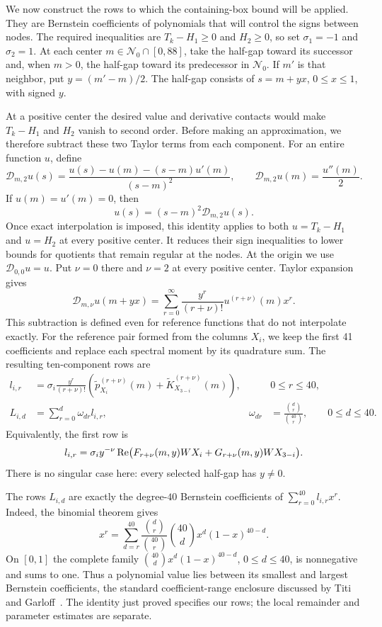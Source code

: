 We now construct the rows to which the containing-box bound will be applied.
They are Bernstein coefficients of polynomials that will control the signs
between nodes.  The required inequalities are $T_k-H_1\ge0$ and
$H_2\ge0$, so set $\sigma_1=-1$ and $\sigma_2=1$.
At each center
$m\in\mathcal N_0\cap[0,88]$, take the half-gap toward its successor and,
when $m>0$, the half-gap toward its predecessor in $\mathcal N_0$.  If $m'$
is that neighbor, put $y=(m'-m)/2$.  The half-gap consists of
$s=m+yx$, $0\le x\le1$, with signed $y$.

At a positive center the desired value and derivative contacts would make
$T_k-H_1$ and $H_2$ vanish to second order.  Before making an approximation,
we therefore subtract these two Taylor terms from each component.  For an
entire function $u$, define
\[
 \mathcal D_{m,2}u(s)
 =\frac{u(s)-u(m)-(s-m)u'(m)}{(s-m)^2},
 \qquad \mathcal D_{m,2}u(m)=\frac{u''(m)}2.
\]
If $u(m)=u'(m)=0$, then
\[
 u(s)=(s-m)^2\mathcal D_{m,2}u(s).
\]
Once exact interpolation is imposed, this identity applies to both
$u=T_k-H_1$ and $u=H_2$ at every positive center.  It reduces their sign
inequalities to lower bounds for quotients that remain regular at the nodes.
At the origin we use $\mathcal D_{0,0}u=u$.  Put $\nu=0$ there and $\nu=2$
at every positive center.  Taylor expansion gives
\[
 \mathcal D_{m,\nu}u(m+yx)
 =\sum_{r=0}^\infty\frac{y^r}{(r+\nu)!}u^{(r+\nu)}(m)x^r.
\]
This subtraction is defined even for reference functions that do not
interpolate exactly.  For the reference pair formed from the columns $X_i$,
we keep the first 41 coefficients and replace each spectral moment by its
quadrature sum.  The resulting ten-component rows are
\begin{equation}\label{eq:bernstein-rows}
\begin{aligned}
 l_{i,r}&=\sigma_i\frac{y^r}{(r+\nu)!}
 \left(\widetilde p_{X_i}^{(r+\nu)}(m)
      +\widetilde K_{X_{3-i}}^{(r+\nu)}(m)\right),&&0\le r\le40,\\
 L_{i,d}&=\sum_{r=0}^d\omega_{dr}l_{i,r},&
 \omega_{dr}&=\frac{\binom dr}{\binom{40}r},\qquad0\le d\le40.
\end{aligned}
\end{equation}
Equivalently, the first row is
\[
 l_{i,r}=\sigma_i y^{-\nu}\operatorname{Re}\bigl(
 F_{r+\nu}(m,y)WX_i+G_{r+\nu}(m,y)WX_{3-i}\bigr).
\]
There is no singular case here: every selected half-gap has $y\ne0$.

The rows $L_{i,d}$ are exactly the degree-$40$ Bernstein coefficients of
$\sum_{r=0}^{40}l_{i,r}x^r$.  Indeed, the binomial theorem gives
\[
 x^r=\sum_{d=r}^{40}\frac{\binom dr}{\binom{40}r}
       \binom{40}d x^d(1-x)^{40-d}.
\]
On $[0,1]$ the complete family
$\binom{40}d x^d(1-x)^{40-d}$, $0\le d\le40$, is nonnegative and sums
to one.  Thus a polynomial value lies between its smallest and largest
Bernstein coefficients, the standard coefficient-range enclosure discussed
by Titi and Garloff~\citep[Section~3]{TitiGarloff2019}.  The identity just proved specifies
our rows; the local remainder and parameter estimates are separate.

